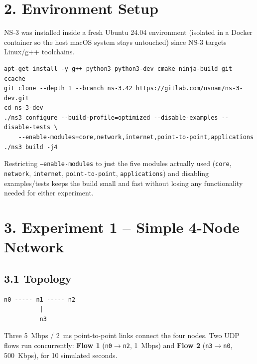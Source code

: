 \documentclass[11pt]{article}
\begin{document}
\section*{2. Environment Setup}
NS-3 was installed inside a fresh Ubuntu 24.04 environment (isolated in a
Docker container so the host macOS system stays untouched) since NS-3 targets
Linux/g++ toolchains.
\begin{lstlisting}[style=bashstyle]
apt-get install -y g++ python3 python3-dev cmake ninja-build git ccache
git clone --depth 1 --branch ns-3.42 https://gitlab.com/nsnam/ns-3-dev.git
cd ns-3-dev
./ns3 configure --build-profile=optimized --disable-examples --disable-tests \
    --enable-modules=core,network,internet,point-to-point,applications
./ns3 build -j4
\end{lstlisting}
Restricting \texttt{--enable-modules} to just the five modules actually used
(\texttt{core}, \texttt{network}, \texttt{internet}, \texttt{point-to-point},
\texttt{applications}) and disabling examples/tests keeps the build small and
fast without losing any functionality needed for either experiment.

\section*{3. Experiment 1 -- Simple 4-Node Network}

\subsection*{3.1 Topology}
\begin{center}
\begin{verbatim}
n0 ----- n1 ----- n2
          |
          n3
\end{verbatim}
\end{center}
Three 5~Mbps / 2~ms point-to-point links connect the four nodes. Two UDP
flows run concurrently: \textbf{Flow 1} (\texttt{n0}$\to$\texttt{n2}, 1~Mbps)
and \textbf{Flow 2} (\texttt{n3}$\to$\texttt{n0}, 500~Kbps), for 10 simulated
seconds.
\end{document}
